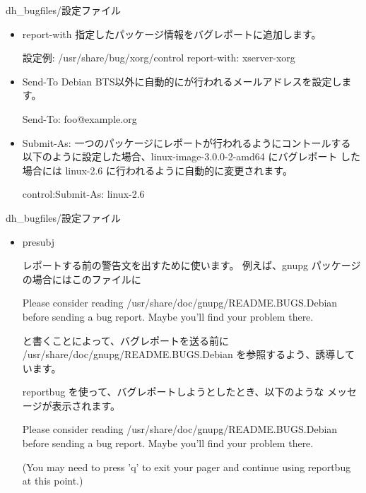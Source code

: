 \begin{frame}[containsverbatim]{dh\_bugfiles/設定ファイル}
  \begin{itemize}
    \item report-with
指定したパッケージ情報をバグレポートに追加します。

\begin{commandline}
設定例:
/usr/share/bug/xorg/control report-with: xserver-xorg
\end{commandline}

    \item Send-To
Debian BTS以外に自動的にが行われるメールアドレスを設定します。

\begin{commandline}
Send-To: foo@example.org
\end{commandline}

    \item Submit-As:
一つのパッケージにレポートが行われるようにコントールする
以下のように設定した場合、linux-image-3.0.0-2-amd64 にバグレポート
した場合には linux-2.6 に行われるように自動的に変更されます。

\begin{commandline}
control:Submit-As: linux-2.6
\end{commandline}
    \end{itemize}

\end{frame}


\begin{frame}[containsverbatim]{dh\_bugfiles/設定ファイル}
  \begin{itemize}
    \item presubj

レポートする前の警告文を出すために使います。
例えば、gnupg パッケージの場合にはこのファイルに
\begin{commandline}
Please consider reading /usr/share/doc/gnupg/README.BUGS.Debian before
sending a bug report. Maybe you'll find your problem there.
\end{commandline}
と書くことによって、バグレポートを送る前に /usr/share/doc/gnupg/README.BUGS.Debian 
を参照するよう、誘導しています。

reportbug を使って、バグレポートしようとしたとき、以下のような
メッセージが表示されます。
\begin{commandline}
Please consider reading /usr/share/doc/gnupg/README.BUGS.Debian before
sending a bug report. Maybe you'll find your problem there.


(You may need to press 'q' to exit your pager and continue using
reportbug at this point.)
\end{commandline}

\end{itemize}
\end{frame}



